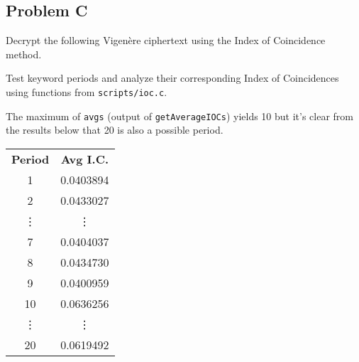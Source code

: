 \documentclass[../hw_sols.tex]{subfiles}
\begin{document}
\newpage



\subsection*{Problem C}

Decrypt the following Vigenère ciphertext using the Index of Coincidence 
method.

\begin{solution}

Test keyword periods and analyze their corresponding Index of Coincidences 
using functions from \verb|scripts/ioc.c|.



\newpage

The maximum of \verb|avgs| (output of \verb|getAverageIOCs|) yields 10 but 
it's clear from the results below that 20 is also a possible period.

\begin{minipage}{0.25\linewidth}
	\begin{tabular}{ c c }
		\textbf{Period} & \textbf{Avg I.C.} \\
		1 & 0.0403894 \\
		2 & 0.0433027 \\
		\vdots & \vdots \\
		7 & 0.0404037 \\
		8 & 0.0434730 \\
		9 & 0.0400959 \\
		\rowcolor{yellow!75} 10 & 0.0636256 \\
		\vdots & \vdots \\
		\rowcolor{yellow!75} 20 & 0.0619492
	\end{tabular}
\end{minipage}
\begin{minipage}{0.7\linewidth}
\end{minipage}


\end{solution}
\end{document}
